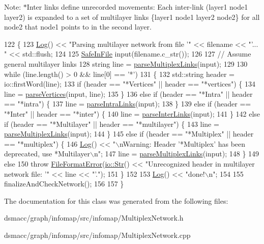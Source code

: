 Note\+: $\ast$\+Inter links define unrecorded movements\+: Each inter-\/link (layer1 node1 layer2) is expanded to a set of multilayer links \{layer1 node1 layer2 node2\} for all node2 that node1 points to in the second layer. 
\begin{DoxyCode}
122 \{
123     \mbox{\hyperlink{classLog}{Log}}() << \textcolor{stringliteral}{"Parsing multilayer network from file '"} << filename << \textcolor{stringliteral}{"'... "} << std::flush;
124 
125     \mbox{\hyperlink{classSafeInFile}{SafeInFile}} input(filename.c\_str());
126 
127     \textcolor{comment}{// Assume general multilayer links}
128     \textcolor{keywordtype}{string} line = \mbox{\hyperlink{classMultiplexNetwork_ad881d099c442d8e2ad242f357a3f97d7}{parseMultiplexLinks}}(input);
129 
130     \textcolor{keywordflow}{while} (line.length() > 0 && line[0] == \textcolor{charliteral}{'*'})
131     \{
132         std::string header = io::firstWord(line);
133         \textcolor{keywordflow}{if} (header == \textcolor{stringliteral}{"*Vertices"} || header == \textcolor{stringliteral}{"*vertices"}) \{
134             line = \mbox{\hyperlink{classNetwork_a57b99ecccedc6200838163fa3b1ad252}{parseVertices}}(input, line);
135         \}
136         \textcolor{keywordflow}{else} \textcolor{keywordflow}{if} (header == \textcolor{stringliteral}{"*Intra"} || header == \textcolor{stringliteral}{"*intra"}) \{
137             line = \mbox{\hyperlink{classMultiplexNetwork_a52326c2cf646b3e15c2266270434629f}{parseIntraLinks}}(input);
138         \}
139         \textcolor{keywordflow}{else} \textcolor{keywordflow}{if} (header == \textcolor{stringliteral}{"*Inter"} || header == \textcolor{stringliteral}{"*inter"}) \{
140             line = \mbox{\hyperlink{classMultiplexNetwork_abf35346b12fdce91821440d0d49e39fc}{parseInterLinks}}(input);
141         \}
142         \textcolor{keywordflow}{else} \textcolor{keywordflow}{if} (header == \textcolor{stringliteral}{"*Multilayer"} || header == \textcolor{stringliteral}{"*multilayer"}) \{
143             line = \mbox{\hyperlink{classMultiplexNetwork_ad881d099c442d8e2ad242f357a3f97d7}{parseMultiplexLinks}}(input);
144         \}
145         \textcolor{keywordflow}{else} \textcolor{keywordflow}{if} (header == \textcolor{stringliteral}{"*Multiplex"} || header == \textcolor{stringliteral}{"*multiplex"}) \{
146             \mbox{\hyperlink{classLog}{Log}}() << \textcolor{stringliteral}{"\(\backslash\)nWarning: Header '*Multiplex' has been deprecated, use *Multilayer\(\backslash\)n"};
147             line = \mbox{\hyperlink{classMultiplexNetwork_ad881d099c442d8e2ad242f357a3f97d7}{parseMultiplexLinks}}(input);
148         \}
149         \textcolor{keywordflow}{else}
150             \textcolor{keywordflow}{throw} \mbox{\hyperlink{classFileFormatError}{FileFormatError}}(\mbox{\hyperlink{classio_1_1Str}{io::Str}}() << \textcolor{stringliteral}{"Unrecognized header in multilayer
       network file: '"} << line << \textcolor{stringliteral}{"'."});
151     \}
152 
153     \mbox{\hyperlink{classLog}{Log}}() << \textcolor{stringliteral}{"done!\(\backslash\)n"};
154 
155     finalizeAndCheckNetwork();
156 
157 \}
\end{DoxyCode}


The documentation for this class was generated from the following files\+:\begin{DoxyCompactItemize}
\item 
dsmacc/graph/infomap/src/infomap/Multiplex\+Network.\+h\item 
dsmacc/graph/infomap/src/infomap/Multiplex\+Network.\+cpp\end{DoxyCompactItemize}
